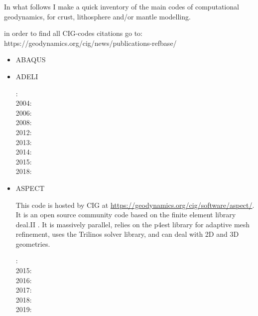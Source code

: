 
In what follows I make a quick inventory of the main codes of computational geodynamics, 
for crust, lithosphere and/or mantle modelling.

in order to find all CIG-codes citations go to: https://geodynamics.org/cig/news/publications-refbase/

\begin{itemize}

\item ABAQUS

\cite{brry01}
\cite{gedh02}
\cite{fumr03}
\cite{camg07}
\cite{kuhe09}
\cite{makh09}
\cite{camg10}
\cite{nalr12}
\cite{pevp15}
\cite{naam17}


\item ADELI

: \cite{hajc97}\\
2004: \cite{gocl04}\\
2006: \cite{vech06} \\
2008: \cite{boht08a}\cite{boht08b}\\
2012: \cite{gech12}\cite{gigh12}\\
2013: \cite{wahd13}\\
2014: \cite{cehg14}\\
2015: \cite{ceag15}\\
2018: \cite{cegm18}\cite{gehn18}

\item ASPECT

This code is hosted by CIG at \url{https://geodynamics.org/cig/software/aspect/}. 
It is an open source community code based on the finite element library deal.II \cite{arbc19}. 
It is massively parallel, relies on the p4est library for adaptive mesh refinement,
uses the Trilinos solver library, and can deal with 2D and 3D geometries. 

: \cite{krhb12}\\
2015: \cite{aupm15}\cite{tosn15}\\
2016: \cite{dahe16}\cite{gadb16}\cite{zhon16}\\
2017: \cite{hepb17}\cite{daef17}\cite{hedg17}\cite{robh17}\cite{robu17}\cite{aumh17}\cite{thie17}\cite{brsg17}
      \cite{onmz17}\cite{tasm17}\cite{zhli17}\\
2018: \cite{daga18}\cite{onzh18}\cite{gltf18}\cite{heps18}\cite{galh18}\cite{peka18}\cite{puth18}\cite{brst18b}\\
2019: \cite{baba19}\cite{stbl19}\cite{cocf19}\cite{liki19}\cite{galb19}\cite{dagg19}


\end{itemize}
